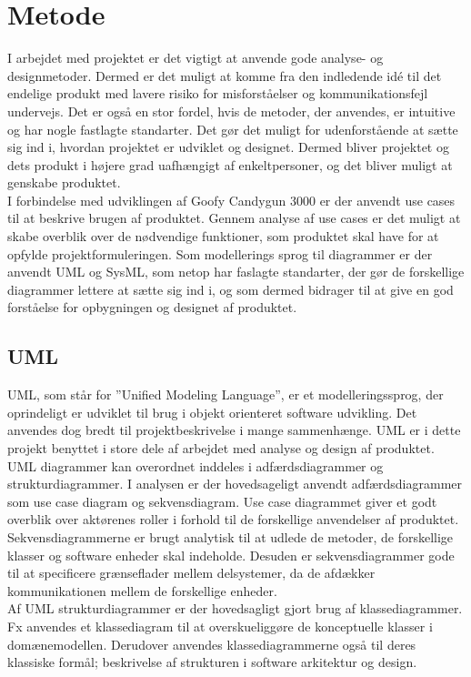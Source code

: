 \chapter{Metode}
I arbejdet med projektet er det vigtigt at anvende gode analyse- og designmetoder. Dermed er det muligt at komme fra den indledende idé til det endelige produkt med lavere risiko for misforståelser og kommunikationsfejl undervejs. Det er også en stor fordel, hvis de metoder, der anvendes, er intuitive og har nogle fastlagte standarter. Det gør det muligt for udenforstående at sætte sig ind i, hvordan projektet er udviklet og designet. Dermed bliver projektet og dets produkt i højere grad uafhængigt af enkeltpersoner, og det bliver muligt at genskabe produktet.\\ 
I forbindelse med udviklingen af Goofy Candygun 3000 er der anvendt use cases til at beskrive brugen af produktet. Gennem analyse af use cases er det muligt at skabe overblik over de nødvendige funktioner, som produktet skal have for at opfylde projektformuleringen. Som modellerings sprog til diagrammer er der anvendt UML og SysML, som netop har faslagte standarter, der gør de forskellige diagrammer lettere at sætte sig ind i, og som dermed bidrager til at give en god forståelse for opbygningen og designet af produktet.


\section{UML}
UML, som står for ”Unified Modeling Language”, er et modelleringssprog, der oprindeligt er udviklet til brug i objekt orienteret software udvikling. Det anvendes dog bredt til projektbeskrivelse i mange sammenhænge. UML er i dette projekt benyttet i store dele af arbejdet med analyse og design af produktet. UML diagrammer kan overordnet inddeles i adfærdsdiagrammer og strukturdiagrammer. I analysen er der hovedsageligt anvendt adfærdsdiagrammer som use case diagram og sekvensdiagram. Use case diagrammet giver et godt overblik over aktørenes roller i forhold til de forskellige anvendelser af produktet. Sekvensdiagrammerne er brugt analytisk til at udlede de metoder, de forskellige klasser og software enheder skal indeholde. Desuden er sekvensdiagrammer gode til at specificere grænseflader mellem delsystemer, da de afdækker kommunikationen mellem de forskellige enheder. \\
Af UML strukturdiagrammer er der hovedsagligt gjort brug af klassediagrammer. Fx anvendes et klassediagram til at overskueliggøre de konceptuelle klasser i domænemodellen. Derudover anvendes klassediagrammerne også til deres klassiske formål; beskrivelse af strukturen i software arkitektur og design. 


